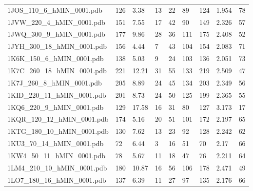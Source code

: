 \documentclass{bioinfo}
\begin{document}
\begin{table}[!t]
{\begin{tabular}{lllllllll}
    1JOS\_110\_6\_hMIN\_0001.pdb & 126      & 3.38       & 13          & 22          & 89          & 124     & 1.954           & 78           \\
    1JVW\_220\_4\_hMIN\_0001.pdb & 151      & 7.55       & 17          & 42          & 90          & 149     & 2.326           & 57           \\
    1JWQ\_300\_9\_hMIN\_0001.pdb & 177      & 9.86       & 28          & 36          & 111         & 175     & 2.408           & 52           \\
    1JYH\_300\_18\_hMIN\_0001.pdb & 156      & 4.44       & 7           & 43          & 104         & 154     & 2.083           & 71           \\
    1K6K\_150\_6\_hMIN\_0001.pdb & 138      & 5.03       & 9           & 24          & 103         & 136     & 2.051           & 73           \\
    1K7C\_260\_18\_hMIN\_0001.pdb & 221      & 12.21      & 31          & 55          & 133         & 219     & 2.509           & 47           \\
    1K7J\_260\_8\_hMIN\_0001.pdb & 205      & 8.89       & 24          & 45          & 134         & 203     & 2.349           & 56           \\
    1KID\_220\_11\_hMIN\_0001.pdb & 201      & 8.73       & 24          & 50          & 125         & 199     & 2.365           & 55           \\
    1KQ6\_220\_9\_hMIN\_0001.pdb & 129      & 17.58      & 16          & 31          & 80          & 127     & 3.173           & 17           \\
    1KQR\_120\_12\_hMIN\_0001.pdb & 174      & 5.16       & 20          & 51          & 101         & 172     & 2.197           & 65           \\
    1KTG\_180\_10\_hMIN\_0001.pdb & 130      & 7.62       & 13          & 23          & 92          & 128     & 2.242           & 62           \\
    1KU3\_70\_14\_hMIN\_0001.pdb & 72       & 6.44       & 3           & 16          & 51          & 70      & 2.17            & 66           \\
    1KW4\_50\_11\_hMIN\_0001.pdb & 78       & 5.67       & 11          & 18          & 47          & 76      & 2.211           & 64           \\
    1LM4\_210\_10\_hMIN\_0001.pdb & 180      & 10.87      & 16          & 56          & 106         & 178     & 2.471           & 49           \\
    1LO7\_180\_16\_hMIN\_0001.pdb & 137      & 6.39       & 11          & 27          & 97          & 135     & 2.176           & 66           \\

\end{tabular}}
\end{table}
\end{document}
